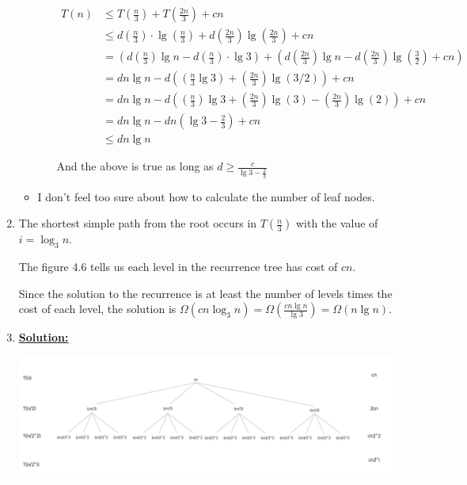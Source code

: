 \documentclass[12pt]{article}
\begin{document}
\begin{enumerate}[1.]
\begin{itemize}
\begin{enumerate}[1.]
            \color{red}
            \begin{align}
                T(n) &\leq T(\frac{n}{3}) + T(\frac{2n}{3}) + cn\\
                &\leq d(\frac{n}{3}) \cdot \lg(\frac{n}{3}) + d(\frac{2n}{3})\lg(\frac{2n}{3}) + cn\\
                &= (d(\frac{n}{3}) \lg n - d(\frac{n}{3}) \cdot \lg 3) + (d (\frac{2n}{3})\lg n - d (\frac{2n}{3})\lg(\frac{3}{2}) + cn)\\
                &= dn \lg n - d( (\frac{n}{3} \lg 3) + (\frac{2n}{3})\lg(3/2) ) + cn\\
                &= dn \lg n - d( (\frac{n}{3}) \lg 3 + (\frac{2n}{3})\lg(3) - (\frac{2n}{3})\lg(2) ) + cn\\
                &= dn \lg n - dn (\lg 3 - \frac{2}{3}) + cn\\
                &\leq dn \lg n
            \end{align}

            \bigskip

            And the above is true as long as $d \geq \frac{c}{\lg 3 - \frac{2}{3}}$

            \color{black}
        \end{enumerate}

        \item I don't feel too sure about how to calculate the number of leaf nodes.
    \end{itemize}

    \item

    \bigskip

    The shortest simple path from the root occurs in $T(\frac{n}{3})$ with the value of $i = \log_3 n$.

    \bigskip

    The figure 4.6 tells us each level in the recurrence tree has cost of $cn$.

    \bigskip

    Since the solution to the recurrence is at least the number of levels times the
    cost of each level, the solution is $\Omega(cn \log_3 n) = \Omega(\frac{cn\lg n}{\lg 3}) = \Omega(n\lg n)$.


    \item
    \setcounter{equation}{0}
    \underline{\textbf{Solution:}}

    \bigskip

    \begin{center}
    \includegraphics[width=\linewidth]{images/worksheet_0_solution_10.png}
    \end{center}


\end{enumerate}
\end{document}
